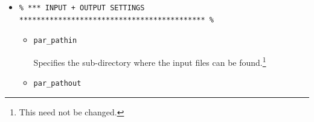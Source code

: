 \begin{itemize}
\begin{itemize}[noitemsep]
\vspace{1mm}
\item \texttt{par\_cfgid}

Specifies an optional template \textit{base-config}. If specified, '\textsf{\footnotesize makecookie} will copy the \textit{base-config} file -- automatically add the required parameter block defining the new continental configuration -- and save this to the output directory (\texttt{par\_pathout}). If empty, \texttt{par\_cfgid=''}, a base-config file will have to be manually selected and the continental configuration parameter block copied-pasted into it.

\vspace{1mm}
\item \texttt{par\_usrid}

Specifies an optional template \textit{user-config}. If specified, '\textsf{\footnotesize makecookie} will copy the \textit{user-config} file and save it to the output directory (\texttt{par\_pathout}). 

\vspace{1mm}
\item \textcolor{blue}{\texttt{par\_age}}

\textcolor{blue}{Defines the geologic age of the configuration (in Ma). This is used to modify the value of the solar constant, as well as initial ocean concentrations of Mg, Ca, SO4.}

\end{itemize}

\newpage

\vspace{2mm}
\item []
\small\vspace{-2pt}\begin{verbatim}
% *** INPUT + OUTPUT SETTINGS ******************************************* %
\end{verbatim}\vspace{-2pt}\normalsize

\begin{itemize}[noitemsep]

\vspace{1mm}
\item \texttt{par\_pathin}

Specifies the sub-directory where the input files can be found.\footnote{This need not be changed.}

\vspace{1mm}
\item \texttt{par\_pathout}


\end{itemize}
\end{itemize}
